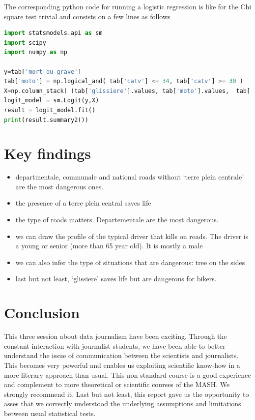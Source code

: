 \documentclass[a4paper]{article}
\theoremstyle{definition}
\theoremstyle{proposition}
\begin{document}
The corresponding python code for running a logistic regression is like for the Chi square test trivial and consists on a few lines as follows

\begin{lstlisting}[language=Python]
import statsmodels.api as sm
import scipy 
import numpy as np

y=tab['mort_ou_grave']
tab['moto'] = np.logical_and( tab['catv'] <= 34, tab['catv'] >= 30 )
X=np.column_stack( (tab['glissiere'].values, tab['moto'].values,  tab['moto'].values * tab['glissiere'].values) )
logit_model = sm.Logit(y,X)
result = logit_model.fit()
print(result.summary2())
\end{lstlisting}

\section{Key findings}
\begin{itemize}
\item departmentale, communale and national roads without `terre plein centrale' are the most dangerous ones.
\item the presence of a terre plein central saves life
\item the type of roads matters. Departementale are the most dangerous.
\item we can draw the profile of the typical driver that kills on roads. The driver is a young or senior (more than 65 year old). It is mostly a male
\item we can also infer the type of situations that are dangerous: tree on the sides 
\item last but not least, `glissiere' saves life but are dangerous for bikers.
\end{itemize}

\section{Conclusion}
This three session about data journalism have been exciting. Through the constant interaction with journalist students, we have been able to better understand the issue of communication between the scientists and journalists. This becomes very powerful and enables us exploiting scientific know-how in a more literary approach than usual. This non-standard course is a good experience and complement to more theoretical or scientific courses of the MASH. We strongly recommend it.
Last but not least, this report gave us the opportunity to asses that we correctly understood the underlying assumptions and limitations between usual statistical tests.
\end{document}
